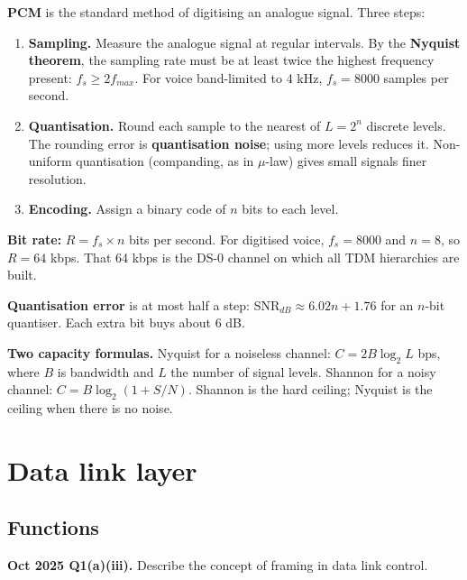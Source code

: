 \documentclass[11pt,a4paper]{article}
\begin{document}
\begin{solbox}
\textbf{PCM} is the standard method of digitising an analogue signal. Three steps:

\begin{enumerate}
\item \textbf{Sampling.} Measure the analogue signal at regular intervals. By the \textbf{Nyquist theorem}, the sampling rate must be at least twice the highest frequency present: $f_s \ge 2 f_{max}$. For voice band-limited to 4 kHz, $f_s = 8000$ samples per second.
\item \textbf{Quantisation.} Round each sample to the nearest of $L = 2^n$ discrete levels. The rounding error is \textbf{quantisation noise}; using more levels reduces it. Non-uniform quantisation (companding, as in $\mu$-law) gives small signals finer resolution.
\item \textbf{Encoding.} Assign a binary code of $n$ bits to each level.
\end{enumerate}

\textbf{Bit rate:} $R = f_s \times n$ bits per second. For digitised voice, $f_s = 8000$ and $n = 8$, so $R = 64$ kbps. That 64 kbps is the DS-0 channel on which all TDM hierarchies are built.

\textbf{Quantisation error} is at most half a step: SNR$_{dB} \approx 6.02n + 1.76$ for an $n$-bit quantiser. Each extra bit buys about 6 dB.
\end{solbox}

\begin{rememberbox}
\textbf{Two capacity formulas.} Nyquist for a noiseless channel: $C = 2B\log_2 L$ bps, where $B$ is bandwidth and $L$ the number of signal levels. Shannon for a noisy channel: $C = B\log_2(1 + S/N)$. Shannon is the hard ceiling; Nyquist is the ceiling when there is no noise.
\end{rememberbox}

\section{Data link layer}

\subsection{Functions}

\begin{pyqbox}
\textbf{Oct 2025 Q1(a)(iii).} Describe the concept of framing in data link control.
\end{pyqbox}
\end{document}
